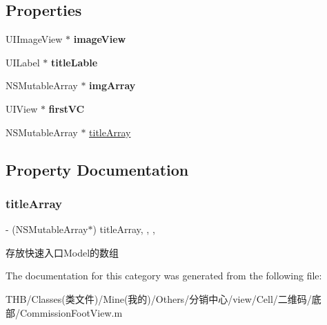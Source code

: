 \subsection*{Properties}
\begin{DoxyCompactItemize}
\item 
\mbox{\label{category_commission_foot_view_07_08_aed46785b58ef40bec54f1cc16722c939}} 
U\+I\+Image\+View $\ast$ {\bfseries image\+View}
\item 
\mbox{\label{category_commission_foot_view_07_08_a256b4ca605306a3ba03224b80b85e6dc}} 
U\+I\+Label $\ast$ {\bfseries title\+Lable}
\item 
\mbox{\label{category_commission_foot_view_07_08_a67ff8965ba8d921e79efa1f9b4b45a1e}} 
N\+S\+Mutable\+Array $\ast$ {\bfseries img\+Array}
\item 
\mbox{\label{category_commission_foot_view_07_08_a83f84341b66c4e9da83889d30622a0fd}} 
U\+I\+View $\ast$ {\bfseries first\+VC}
\item 
N\+S\+Mutable\+Array $\ast$ \mbox{\hyperlink{category_commission_foot_view_07_08_a4cf4b3854e0077411e2968452094bac0}{title\+Array}}
\end{DoxyCompactItemize}


\subsection{Property Documentation}
\mbox{\label{category_commission_foot_view_07_08_a4cf4b3854e0077411e2968452094bac0}} 
\subsubsection{\texorpdfstring{title\+Array}{titleArray}}
{\footnotesize\ttfamily -\/ (N\+S\+Mutable\+Array$\ast$) title\+Array\hspace{0.3cm}{\ttfamily [read]}, {\ttfamily [write]}, {\ttfamily [nonatomic]}, {\ttfamily [strong]}}

存放快速入口\+Model的数组 

The documentation for this category was generated from the following file\+:\begin{DoxyCompactItemize}
\item 
T\+H\+B/\+Classes(类文件)/\+Mine(我的)/\+Others/分销中心/view/\+Cell/二维码/底部/Commission\+Foot\+View.\+m\end{DoxyCompactItemize}
